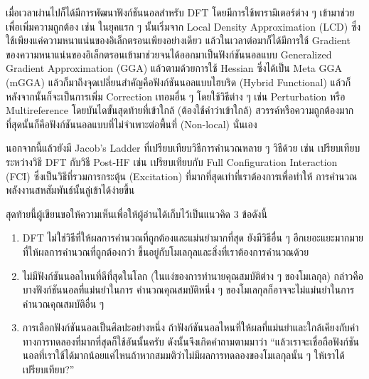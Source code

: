 เมื่อเวลาผ่านไปก็ได้มีการพัฒนาฟังก์ชันนอลสำหรับ DFT โดยมีการใช้พารามิเตอร์ต่าง ๆ เข้ามาช่วยเพื่อเพิ่มความถูกต้อง เช่น ในยุคแรก ๆ นั้นเริ่มจาก
Local Density Approximation (LCD) ซึ่งใช้เพียงแค่ความหนาแน่นของอิเล็กตรอนเพียงอย่างเดียว แล้วในเวลาต่อมาก็ได้มีการใช้ Gradient
ของความหนาแน่นของอิเล็กตรอนเข้ามาช่วยจนได้ออกมาเป็นฟังก์ชันนอลแบบ Generalized Gradient Approximation (GGA)\autocite{perdew1996}
แล้วตามด้วยการใช้ Hessian ซึ่งได้เป็น Meta GGA (mGGA) แล้วก็มาถึงจุดเปลี่ยนสำคัญคือฟังก์ชันนอลแบบไฮบริด (Hybrid Functional)
แล้วก็หลังจากนั้นก็จะเป็นการเพิ่ม Correction เทอมอื่น ๆ โดยใช้วิธีต่าง ๆ เช่น Perturbation หรือ Multireference โดยบันไดขั้นสุดท้ายที่เข้าใกล้
(ต้องใช้คำว่าเข้าใกล้) สวรรค์หรือความถูกต้องมากที่สุดนั้นก็คือฟังก์ชันนอลแบบที่ไม่จำเพาะต่อพื้นที่ (Non-local) นั่นเอง

นอกจากนี้แล้วยังมี Jacob's Ladder ที่เปรียบเทียบวิธีการคำนวณหลาย ๆ วิธีด้วย เช่น เปรียบเทียบระหว่างวิธี DFT กับวิธี Post-HF เช่น
เปรียบเทียบกับ Full Configuration Interaction (FCI) ซึ่งเป็นวิธีที่รวมการกระตุ้น (Excitation) ที่มากที่สุดเท่าที่เราต้องการเพื่อทำให้%
การคำนวณพลังงานสหสัมพันธ์นั้นลู่เข้าได้ง่ายขึ้น

สุดท้ายนี้ผู้เขียนขอให้ความเห็นเพื่อให้ผู้อ่านได้เก็บไว้เป็นแนวคิด 3 ข้อดังนี้
%
\begin{enumerate}[topsep=0pt,noitemsep]\setlength\itemsep{0.5em}
    \item DFT ไม่ใช่วิธีที่ให้ผลการคำนวณที่ถูกต้องและแม่นยำมากที่สุด ยังมีวิธีอื่น ๆ อีกเยอะแยะมากมายที่ให้ผลการคำนวณที่ถูกต้องกว่า
          ขึ้นอยู่กับโมเลกุลและสิ่งที่เราต้องการคำนวณด้วย

    \item ไม่มีฟังก์ชันนอลไหนที่ดีที่สุดในโลก (ในแง่ของการทำนายคุณสมบัติต่าง ๆ ของโมเลกุล) กล่าวคือบางฟังก์ชันนอลที่แม่นยำในการ%
          คำนวณคุณสมบัติหนึ่ง ๆ ของโมเลกุลก็อาจจะไม่แม่นยำในการคำนวณคุณสมบัติอื่น ๆ

    \item การเลือกฟังก์ชันนอลเป็นศิลปะอย่างหนึ่ง ถ้าฟังก์ชันนอลไหนที่ให้ผลที่แม่นยำและใกล้เคียงกับค่าทางการทดลองที่มากที่สุดก็ใช้อันนั้นครับ
          ดังนั้นจึงเกิดคำถามตามมาว่า \enquote{แล้วเราจะเชื่อถือฟังก์ชันนอลที่เราใช้ได้มากน้อยแค่ไหนถ้าหากสมมติว่าไม่มีผลการทดลองของโมเลกุลนั้น ๆ
              ให้เราได้เปรียบเทียบ?}
\end{enumerate}
